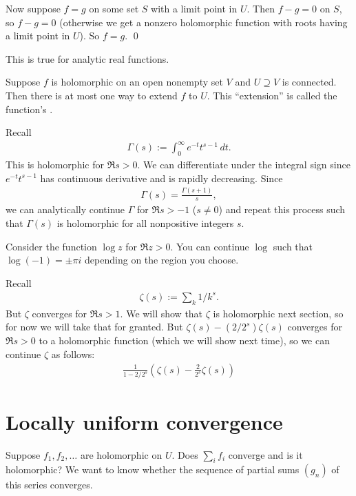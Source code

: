 \documentclass[11pt, oneside,margin=1in]{article}
\begin{document}
Now suppose $f=g$ on some set $S$ with a limit point in $U$. Then $f-g=0$ on $S$, so $f-g=0$ (otherwise we get a nonzero holomorphic function with roots having a limit point in $U$). So $f=g$. \hfill \qed

This is true for analytic real functions. 

Suppose $f$ is holomorphic on an open nonempty set $V$ and $U\supseteq V$ is connected. Then there is at most one way to extend $f$ to $U$. This ``extension'' is called the function's  .

\begin{example}\label{}\text{}
Recall 
\begin{align*}
	\Gamma(s) :=  \int_{0}^{\infty} e^{-t}t^{s-1}  \, dt. 
\end{align*}
This is holomorphic for $\Re s > 0$. We can differentiate under the integral sign since $e^{-t}t^{s-1}$ has continuous derivative and is rapidly decreasing. Since 
\begin{align*}
	\Gamma (s) =  \frac{\Gamma(s+1)}{s},
\end{align*}
we can analytically continue $\Gamma$ for $\Re s>-1$ ($s\ne 0$) and repeat this process such that $\Gamma(s)$ is holomorphic for all nonpositive integers $s$.
\end{example}

\begin{example}[ ]\label{}\text{}
Consider the function $\log z$ for $\Re z > 0$. You can continue $\log$ such that $\log(-1) = \pm \pi i$ depending on the region you choose. 
\end{example}

\begin{example}\label{}\text{}
Recall 
\begin{align*}
	\zeta(s) :=  \sum_{k}^{} 1/k^s.
\end{align*}
But $\zeta$ converges for $\Re s > 1$. We will show that $\zeta$ is holomorphic next section, so for now we will take that for granted. But $\zeta(s)-  ({2}/{2^s})\zeta(s)$ converges for $\Re s > 0$ to a holomorphic function (which we will show next time), so we can continue $\zeta$ as follows:
 \begin{align*}
	\frac{1}{1-2/2^s}\left(\zeta(s)- \frac{2}{2^s}\zeta(s)\right)
\end{align*}
\end{example}

\section{Locally uniform convergence}
Suppose $f_1,f_2,\hdots$ are holomorphic on $U$. Does $\sum_{i}^{} f_i$ converge and is it holomorphic? We want to know whether the sequence of partial sums $(g_n)$ of this series converges.
\end{document}
